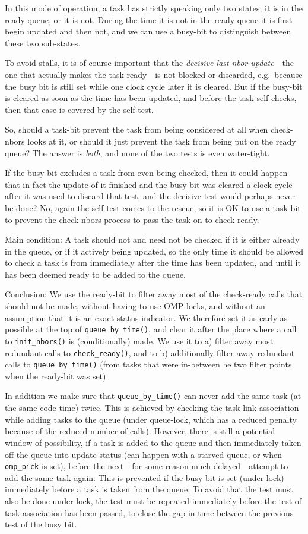 \documentclass[paper=a4,fontsize=11pt]{scrartcl}
\numberwithin{equation}{section}		%
\numberwithin{figure}{section}			%
\numberwithin{table}{section}				%
\newcommand{\codecolor}{\color{Blue}}
\newcommand{\Code}[1]{{\codecolor\texttt{#1}}}
\def\checkready{\Code{check\_ready()}}
\def\initnbors{\Code{init\_nbors()}}
\def\queuebytime{\Code{queue\_by\_time()}}
\begin{document}
In this mode of operation, a task has strictly speaking only two states; it is in the ready queue, or it is not.   During the time it is not in the ready-queue it is first begin updated and then not, and we can use a busy-bit to distinguish between these two sub-states.

To avoid stalls, it is of course important that the \textit{decisive last nbor update}---the one that actually makes the task ready---is not blocked or discarded, e.g.\ because the busy bit is still set while one clock cycle later it is cleared.  But if the busy-bit is cleared as soon as the time has been updated, and before the task self-checks, then that case is covered by the self-test.

So, should a task-bit prevent the task from being considered at all when check-nbors looks at it, or should it just prevent the task from being put on the ready queue? The answer is \textit{both}, and none of the two tests is even water-tight.

If the busy-bit excludes a task from even being checked, then it could happen that in fact the update of it finished and the busy bit was cleared a clock cycle after it was used to discard that test, and the decisive test would perhaps never be done?  No, again the self-test comes to the rescue, so it is OK to use a task-bit to prevent the check-nbors process to pass the task on to check-ready.

Main condition: A task should not and need not be checked if it is either already in the queue, or if it actively being updated, so the only time it should be allowed to check a task is from immediately after the time has been updated, and until it has been deemed ready to be added to the queue.

Conclusion:  We use the ready-bit to filter away most of the check-ready calls that should not be made, without having to use OMP locks, and without an assumption that it is an exact status indicator.  We therefore set it as early as possible at the top of \queuebytime{}, and clear it after the place where a call to \initnbors{} is (conditionally) made.  We use it to a) filter away most redundant calls to \checkready, and to b) additionally filter away redundant calls to \queuebytime{} (from tasks that were in-between he two filter points when the ready-bit was set).

In addition we make sure that \queuebytime{} can never add the same task (at the same code time) twice.  This is achieved by checking the task link association while adding tasks to the queue (under queue-lock, which has a reduced penalty because of the reduced number of calls).   However, there is still a potential window of possibility, if a task is added to the queue and then immediately taken off the queue into update status (can happen with a starved queue, or when \Code{omp\_pick} is set), before the next---for some reason much delayed---attempt to add the same task again.  This is prevented if the busy-bit is set (under lock) immediately before a task is taken from the queue.  To avoid that the test must also be done under lock, the test must be repeated immediately before the test of task association has been passed, to close the gap in time between the previous test of the busy bit.
\end{document}
